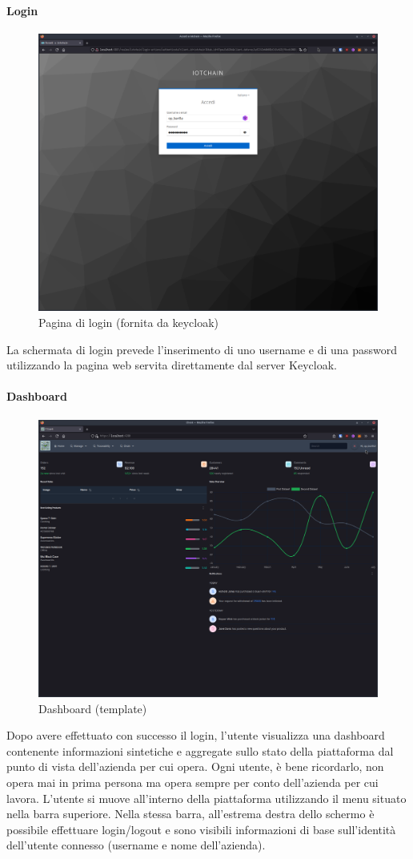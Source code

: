 \documentclass[a4paper,11pt]{article}
\begin{document}
\paragraph{Login}
\begin{figure}[H]
  \centering
  \includegraphics[width=0.5\linewidth]{screenIotChain/0001.png}
  \caption{Pagina di login (fornita da keycloak)}
  \label{fig:screen1_login}
\end{figure}

La schermata di login prevede l'inserimento di uno username e di una password utilizzando la pagina web servita direttamente dal server Keycloak.


\paragraph{Dashboard}

\begin{figure}[H]
  \centering
  \includegraphics[width=0.50\linewidth]{screenIotChain/0002.png}
  \caption{Dashboard (template)}
  \label{fig:screen2}
\end{figure}

Dopo avere effettuato con successo il login, l'utente visualizza una dashboard contenente informazioni sintetiche e aggregate sullo stato della piattaforma dal punto di vista dell'azienda per cui opera. Ogni utente, è bene ricordarlo, non opera mai in prima persona ma opera sempre per conto dell'azienda per cui lavora. L'utente si muove all'interno della piattaforma utilizzando il menu situato nella barra superiore. Nella stessa barra, all'estrema destra dello schermo è possibile effettuare login/logout e sono visibili informazioni di base sull'identità dell'utente connesso (username e nome dell'azienda).
\end{document}
